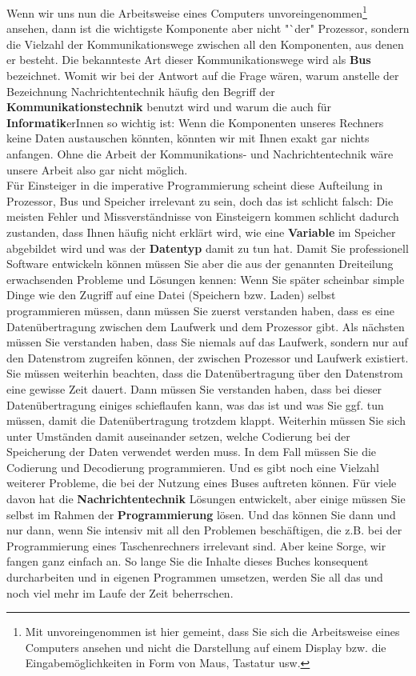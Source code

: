 Wenn wir uns nun die Arbeitsweise eines Computers unvoreingenommen\footnote{Mit unvoreingenommen ist hier gemeint, dass Sie sich die Arbeitsweise eines Computers ansehen und nicht die Darstellung auf einem Display bzw. die Eingabemöglichkeiten in Form von Maus, Tastatur usw.} ansehen, dann ist die wichtigste Komponente aber nicht "`der" Prozessor, sondern die Vielzahl der Kommunikationswege zwischen all den Komponenten, aus denen er besteht. Die bekannteste Art dieser Kommunikationswege wird als \textbf{Bus} bezeichnet. Womit wir bei der Antwort auf die Frage wären, warum anstelle der Bezeichnung Nachrichtentechnik häufig den Begriff der \textbf{Kommunikationstechnik} benutzt wird und warum die auch für \textbf{Informatik}erInnen so wichtig ist: Wenn die Komponenten unseres Rechners keine Daten austauschen könnten, könnten wir mit Ihnen exakt gar nichts anfangen. Ohne die Arbeit der Kommunikations- und Nachrichtentechnik wäre unsere Arbeit also gar nicht möglich.\\

Für Einsteiger in die imperative Programmierung scheint diese Aufteilung in Prozessor, Bus und Speicher irrelevant zu sein, doch das ist schlicht falsch: Die meisten Fehler und Missverständnisse von Einsteigern kommen schlicht dadurch zustanden, dass Ihnen häufig nicht erklärt wird, wie eine \textbf{Variable} im Speicher abgebildet wird und was der \textbf{Datentyp} damit zu tun hat. Damit Sie professionell Software entwickeln können müssen Sie aber die aus der genannten Dreiteilung erwachsenden Probleme und Lösungen kennen: Wenn Sie später scheinbar simple Dinge wie den Zugriff auf eine Datei (Speichern bzw. Laden) selbst programmieren müssen, dann müssen Sie zuerst verstanden haben, dass es eine Datenübertragung zwischen dem Laufwerk und dem Prozessor gibt. Als nächsten müssen Sie verstanden haben, dass Sie niemals auf das Laufwerk, sondern nur auf den Datenstrom zugreifen können, der zwischen Prozessor und Laufwerk existiert. Sie müssen weiterhin beachten, dass die Datenübertragung über den Datenstrom eine gewisse Zeit dauert. Dann müssen Sie verstanden haben, dass bei dieser Datenübertragung einiges schieflaufen kann, was das ist und was Sie ggf. tun müssen, damit die Datenübertragung trotzdem klappt. Weiterhin müssen Sie sich unter Umständen damit auseinander setzen, welche Codierung bei der Speicherung der Daten verwendet werden muss. In dem Fall müssen Sie die Codierung und Decodierung programmieren. Und es gibt noch eine Vielzahl weiterer Probleme, die bei der Nutzung eines Buses auftreten können. Für viele davon hat die \textbf{Nachrichtentechnik} Lösungen entwickelt, aber einige müssen Sie selbst im Rahmen der \textbf{Programmierung} lösen. Und das können Sie dann und nur dann, wenn Sie intensiv mit all den Problemen beschäftigen, die z.B. bei der Programmierung eines Taschenrechners irrelevant sind. Aber keine Sorge, wir fangen ganz einfach an. So lange Sie die Inhalte dieses Buches konsequent durcharbeiten und in eigenen Programmen umsetzen, werden Sie all das und noch viel mehr im Laufe der Zeit beherrschen.\\


